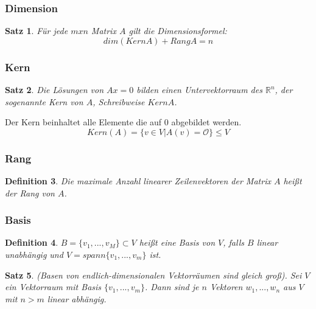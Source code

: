 \documentclass[12pt,a4paper]{report}%
\newtheorem{satz}{Satz}[section]
\newtheorem{definition}[satz]{Definition}
\numberwithin{equation}{section}
\newcommand{\R}{\mathbb{R}} %
\numberwithin{equation}{subsection}
\begin{document}
	  \subsubsection{Dimension}
    \begin{satz}
      Für jede $mxn$ Matrix $A$ gilt die Dimensionsformel: \newline 
      \begin{equation}
      dim(KernA) + RangA = n
      \end{equation}
    \end{satz}	 
    
    \subsubsection{Kern}
    \begin{satz}
      Die Lösungen von $Ax = 0$ bilden einen Untervektorraum des $\R^n$, der sogenannte Kern von $A$, Schreibweise $KernA$.
    \end{satz} 
    Der Kern beinhaltet alle Elemente die auf $0$ abgebildet werden.
    \begin{equation}
      Kern(A) = \lbrace v \in V |A(v) = \mathcal{O}\rbrace \leq V
    \end{equation}
    
	  \subsubsection{Rang}
	  \begin{definition}
	    Die maximale Anzahl linearer Zeilenvektoren der Matrix $A$ heißt der Rang von $A$. 
   \end{definition} 
	  
	  \subsubsection{Basis}
	  \begin{definition}
	    $B = \lbrace v_1,...,v_M\rbrace \subset V$ heißt eine Basis von $V$, falls $B$ linear unabhängig und $V = spann \lbrace v_1,...,v_m \rbrace$ ist.
	  \end{definition}
	 
    \begin{satz}
      \glqq (Basen von endlich-dimensionalen Vektorräumen sind gleich groß).\newline
      Sei $V$ ein Vektorraum mit Basis $\lbrace v_1,...,v_m\rbrace$. Dann sind je $n$ Vektoren $w_1,...,w_n$ aus $V$ mit $n>m$ linear abhängig. \grqq \cite{HM12}
    \end{satz}
     
\end{document}
